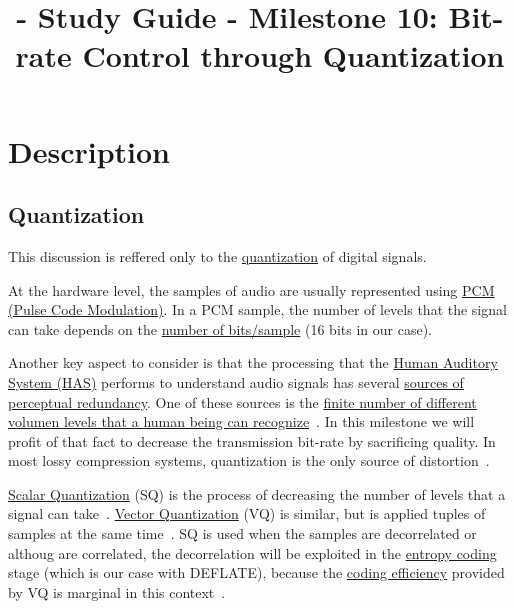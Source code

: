 
\title{\TM{} - Study Guide - Milestone 10: Bit-rate Control through Quantization}

\maketitle

\section{Description}

\subsection{Quantization}
This discussion is reffered only to the
\href{https://en.wikipedia.org/wiki/Quantization_(signal_processing)}{quantization}
of digital signals.

At the hardware level, the samples of audio are usually represented
using \href{https://en.wikipedia.org/wiki/Pulse-code_modulation}{PCM
  (Pulse Code Modulation)}. In a PCM sample, the number of levels that
the signal can take depends on the
\href{https://en.wikipedia.org/wiki/Audio_bit_depth}{number of
  bits/sample} (16 bits in our case).

Another key aspect to consider is that the processing that the
\href{https://en.wikipedia.org/wiki/Auditory_system}{Human Auditory
  System (HAS)} performs to understand audio signals has several
\href{https://en.wikipedia.org/wiki/Psychoacoustics}{sources of
  perceptual redundancy}. One of these sources is the
\href{https://en.wikipedia.org/wiki/Equal-loudness_contour}{finite
  number of different volumen levels that a human being can
  recognize}~\cite{bosi2003intro}. In this milestone we will profit of
that fact to decrease the transmission bit-rate by sacrificing
quality.  In most lossy compression systems, quantization is the only
source of distortion~\cite{taubman2002jpeg2000}.

\href{https://en.wikipedia.org/wiki/Quantization_(signal_processing)}{Scalar
  Quantization} (SQ) is the process of decreasing the number of levels
that a signal can
take~\cite{sayood2017introduction}. \href{https://en.wikipedia.org/wiki/Vector_quantization}{Vector
Quantization} (VQ) is similar, but is applied tuples of samples at the
same time~\cite{vetterli2014foundations}. SQ is used when the samples
are decorrelated or althoug are correlated, the decorrelation will be
exploited in
the \href{https://en.wikipedia.org/wiki/Entropy_encoding}{entropy
coding} stage (which is our case with DEFLATE), because the
\href{https://en.wikipedia.org/wiki/Quantization_(signal_processing)#Rate%E2%80%93distortion_optimization}{coding
  efficiency} provided by VQ is marginal in this
context~\cite{vetterli2014foundations}.

